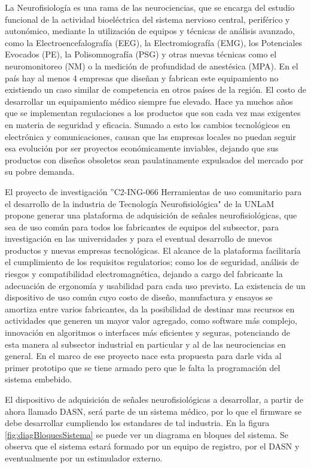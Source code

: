 \documentclass[
11pt, %
codirector, %
]{charter}
\begin{document}
La Neurofisiología es una rama de las neurociencias, que se encarga del estudio funcional de la actividad bioeléctrica del sistema nervioso central, periférico y autonómico, mediante la utilización de equipos y técnicas de análisis avanzado, como la Electroencefalografía (EEG), la Electromiografía (EMG), los Potenciales Evocados (PE), la Polisomnografía (PSG) y otras nuevas técnicas como el neuromonitoreo (NM) o la medición de profundidad de anestésica (MPA). En el país hay al menos 4 empresas que diseñan y fabrican este equipamiento no existiendo un caso similar de competencia en otros países de la región. El costo de desarrollar un equipamiento médico siempre fue elevado. Hace ya muchos años que se implementan regulaciones a los productos que son cada vez mas exigentes en materia de seguridad y eficacia. Sumado a esto los cambios tecnológicos en electrónica y comunicaciones, causan que las empresas locales no puedan seguir esa evolución por ser proyectos económicamente inviables, dejando que sus productos con diseños obsoletos sean paulatinamente expulsados del mercado por su pobre demanda. 

El proyecto de investigación ''C2-ING-066 Herramientas de uso comunitario para el desarrollo de la industria de Tecnología Neurofisiológica" de la UNLaM propone generar una plataforma de adquisición de señales neurofisiológicas, que sea de uso común para todos los fabricantes de equipos del subsector, para investigación en las universidades y para el eventual desarrollo de nuevos productos y nuevas empresas tecnológicas. El alcance de la plataforma facilitaría el cumplimiento de los requisitos regulatorios; como los de seguridad, análisis de riesgos y compatibilidad electromagnética, dejando a cargo del fabricante la adecuación de ergonomía y usabilidad para cada uso previsto. La existencia de un dispositivo de uso común cuyo costo de diseño, manufactura y ensayos se amortiza entre varios fabricantes, da la posibilidad de destinar mas recursos en actividades que generen un mayor valor agregado, como software más complejo, innovación en algoritmos o interfaces más eficientes y seguras, potenciando de esta manera al subsector industrial en particular y al de las neurociencias en general. En el marco de ese proyecto nace esta propuesta para darle vida al primer prototipo que se tiene armado pero que le falta la programación del sistema embebido.

El dispositivo de adquisición de señales neurofisiológicas a desarrollar, a partir de ahora llamado DASN, será parte de un sistema médico, por lo que el firmware se debe desarrollar cumpliendo los estandares de tal industria. En la figura \ref{fig:diagBloquesSistema} se puede ver un diagrama en bloques del sistema. Se observa que el sistema estará formado por un equipo de registro, por el DASN y eventualmente por un estimulador externo. 
\end{document}
